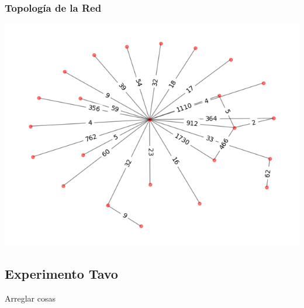 \subsubsection{Topolog\'ia de la Red}
 \includegraphics[scale=0.6]{../plots/trabajo_s2_topologia.png}

\subsection{Experimento Tavo}

Arreglar cosas